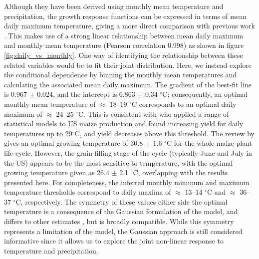 \documentclass[12pt]{article}
\begin{document}
Although they have been derived using monthly mean temperature and precipitation, the growth response functions can be expressed in terms of mean daily maximum temperature, giving a more direct comparison with previous work \citep[e.g.][]{schlenker:2009, hatfield:2011, sanchez:2014, hatfield:2015}. This makes use of a strong linear relationship between mean daily maximum and monthly mean temperature (Pearson correlation 0.998) as shown in figure \ref{fig:daily_vs_monthly}. One way of identifying the relationship between these related variables would be to fit their joint distribution. Here, we instead explore the conditional dependence by binning the monthly mean temperatures and calculating the associated mean daily maximum. The gradient of the best-fit line is 0.967 $\pm$ 0.024, and the intercept is 6.863 $\pm$ 0.34 $^\circ$C; consequently, an optimal monthly mean temperature of $\approx$ 18--19 $^\circ$C corresponds to an optimal daily maximum of $\approx$ 24--25 $^\circ$C. This is consistent with \cite{schlenker:2009} who applied a range of statistical models to US maize production and found increasing yield for daily temperatures up to 29$^\circ$C, and yield decreases above this threshold. The review by \cite{sanchez:2014} gives an optimal growing temperature of 30.8 $\pm$ 1.6 $^\circ$C for the whole maize plant life-cycle. However, the grain-filling stage of the cycle (typically June and July in the US) appears to be the most sensitive to temperature, with the optimal growing temperature given as 26.4 $\pm$ 2.1 $^\circ$C, overlapping with the results presented here. For completeness, the inferred monthly minimum and maximum temperature thresholds correspond to daily maxima of $\approx$ 13--14 $^\circ$C and $\approx$ 36--37 $^\circ$C, respectively. The symmetry of these values either side the optimal temperature is a consequence of the Gaussian formulation of the model, and differs to other estimates \citep[e.g.][and references therein]{zhou:2018}, but is broadly compatible. While this symmetry represents a limitation of the model, the Gaussian approach is still considered informative since it allows us to explore the joint non-linear response to temperature and precipitation.
\end{document}
